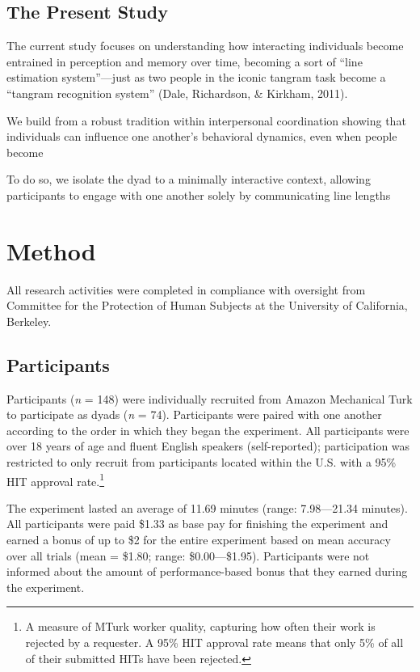 \documentclass[10pt, letterpaper]{article}
\begin{document}
\subsection{The Present Study}\label{the-present-study}

The current study focuses on understanding how interacting individuals
become entrained in perception and memory over time, becoming a sort of
``line estimation system''---just as two people in the iconic tangram
task become a ``tangram recognition system'' (Dale, Richardson, \&
Kirkham, 2011).

We build from a robust tradition within interpersonal coordination
showing that individuals can influence one another's behavioral
dynamics, even when people become

To do so, we isolate the dyad to a minimally interactive context,
allowing participants to engage with one another solely by communicating
line lengths

\section{Method}\label{method}

All research activities were completed in compliance with oversight from
Committee for the Protection of Human Subjects at the University of
California, Berkeley.

\subsection{Participants}\label{participants}

Participants (\emph{n} = 148) were individually recruited from Amazon
Mechanical Turk to participate as dyads (\emph{n} = 74). Participants
were paired with one another according to the order in which they began
the experiment. All participants were over 18 years of age and fluent
English speakers (self-reported); participation was restricted to only
recruit from participants located within the U.S. with a 95\% HIT
approval
rate.\footnote{A measure of MTurk worker quality, capturing how often their work is rejected by a requester. A 95\% HIT approval rate means that only 5\% of all of their submitted HITs have been rejected.}

The experiment lasted an average of 11.69 minutes (range: 7.98---21.34
minutes). All participants were paid \$1.33 as base pay for finishing
the experiment and earned a bonus of up to \$2 for the entire experiment
based on mean accuracy over all trials (mean = \$1.80; range:
\$0.00---\$1.95). Participants were not informed about the amount of
performance-based bonus that they earned during the experiment.
\end{document}
